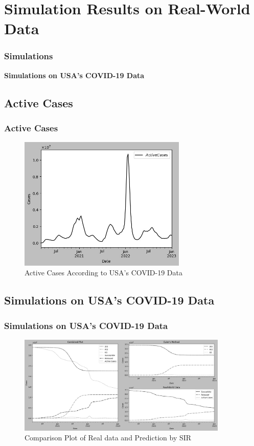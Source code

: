 \documentclass{beamer}
\begin{document}
\section{Simulation Results on Real-World Data}
\begin{frame}\frametitle{Simulations}
    \begin{center}
        \textbf{Simulations on USA's COVID-19 Data}
    \end{center}
\end{frame}

\subsection{Active Cases}
\begin{frame}\frametitle{Active Cases}
        \begin{figure}
        \caption{Active Cases According to USA's COVID-19 Data}
        \centering
        \includegraphics[width=8cm]{Figure_Active_Cases.jpeg}
    \end{figure}
\end{frame}

\subsection{Simulations on USA's COVID-19 Data}
\begin{frame}\frametitle{Simulations on USA's COVID-19 Data}
    \begin{figure}
        \caption{Comparison Plot of Real data and Prediction by SIR}
        \centering
        \includegraphics[width=10cm]{Figure_USAPredict.png}
    \end{figure}
\end{frame}
\end{document}
